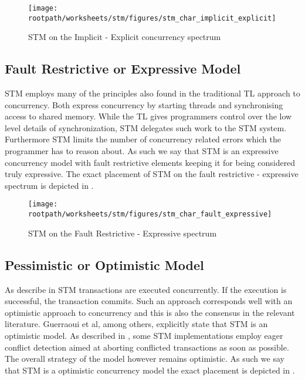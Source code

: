 \begin{figure}[htbp]
\centering
 \texttt{[image: \\rootpath/worksheets/stm/figures/stm\_char\_implicit\_explicit]} 
 \caption{\ac{STM} on the Implicit - Explicit concurrency spectrum}
\label{fig:stm_char_impli_expli}
\end{figure}

\subsection{Fault Restrictive or Expressive Model}
\ac{STM} employs many of the principles also found in the traditional \ac{TL} approach to concurrency. Both express concurrency by starting threads and synchronising access to shared memory. While the \ac{TL} gives programmers control over the low level details of synchronization, \ac{STM} delegates such work to the \ac{STM} system. Furthermore \ac{STM} limits the number of concurrency related errors which the programmer has to reason about. As such we say that \ac{STM} is an expressive concurrency model with fault restrictive elements keeping it for being considered truly expressive. The exact placement of \ac{STM} on the fault restrictive - expressive spectrum is depicted in .

\begin{figure}[htbp]
\centering
 \texttt{[image: \\rootpath/worksheets/stm/figures/stm\_char\_fault\_expressive]} 
 \caption{\ac{STM} on the Fault Restrictive - Expressive spectrum}
\label{fig:stm_char_fault_expressive}
\end{figure}

\subsection{Pessimistic or Optimistic Model}
As describe in  \ac{STM} transactions are executed concurrently. If the execution is successful, the transaction commits. Such an approach corresponds well with an optimistic approach to concurrency and this is also the consensus in the relevant literature. Guerraoui et al, among others, explicitly state that \ac{STM} is an optimistic model\cite[p. 1]{guerraoui2005toward}. As described in , some \ac{STM} implementations employ eager conflict detection aimed at aborting conflicted transactions as soon as possible. The overall strategy of the model however remains optimistic. As such we say that \ac{STM} is a optimistic concurrency model the exact placement is depicted in .

